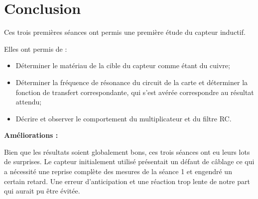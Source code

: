 \newpage
\section{Conclusion}

Ces trois premières séances ont permis une première étude du capteur
inductif.

Elles ont permis de :

\begin{itemize}
    \item Déterminer le matériau de la cible du capteur comme étant du cuivre;
    \item Déterminer la fréquence de résonance du circuit de la carte et déterminer la fonction 
    de transfert correspondante, qui s'est avérée correspondre au résultat attendu; 
    \item Décrire et observer le comportement du multiplicateur et du filtre RC. 
\end{itemize}

\textbf{Améliorations :}

Bien que les résultats soient globalement bons, ces trois séances ont eu leurs lots de surprises.
Le capteur initialement utilisé présentait un défaut de câblage ce qui a nécessité une reprise 
complète des mesures de la séance 1 et engendré un certain retard. Une erreur d'anticipation et  
une réaction trop lente de notre part qui aurait pu être évitée.



